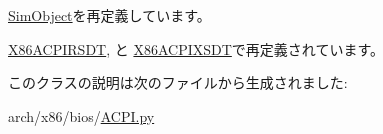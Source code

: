 \hyperlink{classm5_1_1SimObject_1_1SimObject_acce15679d830831b0bbe8ebc2a60b2ca}{SimObject}を再定義しています。

\hyperlink{classACPI_1_1X86ACPIRSDT_acce15679d830831b0bbe8ebc2a60b2ca}{X86ACPIRSDT}, と \hyperlink{classACPI_1_1X86ACPIXSDT_acce15679d830831b0bbe8ebc2a60b2ca}{X86ACPIXSDT}で再定義されています。

このクラスの説明は次のファイルから生成されました:\begin{DoxyCompactItemize}
\item 
arch/x86/bios/\hyperlink{ACPI_8py}{ACPI.py}\end{DoxyCompactItemize}
